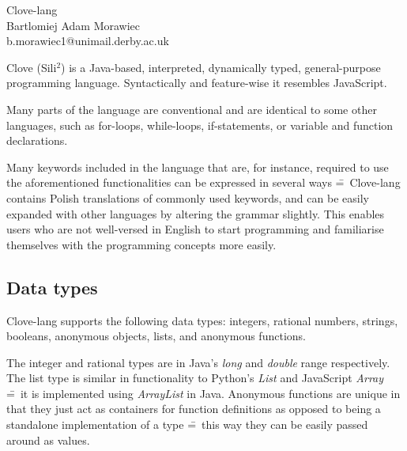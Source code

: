 \documentclass[12pt,a4paper]{article}
\begin{document}
\begin{center}
  \Huge {Clove-lang}\\[0.25cm]
  \small {Bartlomiej Adam Morawiec\\
  b.morawiec1@unimail.derby.ac.uk}\par
\end{center}

\noindent Clove (Sili$^2$) is a Java-based, interpreted, dynamically typed, general-purpose programming language. Syntactically and feature-wise it resembles JavaScript.\par

Many parts of the language are conventional and are identical to some other languages, such as for-loops, while-loops, if-statements, or variable and function declarations.\par

Many keywords included in the language that are, for instance, required to use the aforementioned functionalities can be expressed in several ways \==~Clove-lang contains Polish translations of commonly used keywords, and can be easily expanded with other languages by altering the grammar slightly. This enables users who are not well-versed in English to start programming and familiarise themselves with the programming concepts more easily.



\subsection*{Data types}


Clove-lang supports the following data types: integers, rational numbers, strings, booleans, anonymous objects, lists, and anonymous functions.\par

The integer and rational types are in Java's \emph{long} and \emph{double} range respectively. The list type is similar in functionality to Python's \emph{List} and JavaScript \emph{Array} \==~it is implemented using \emph{ArrayList} in Java. Anonymous functions are unique in that they just act as containers for function definitions as opposed to being a standalone implementation of a type \==~this way they can be easily passed around as values.
\end{document}

